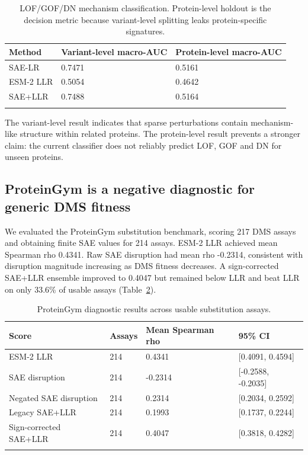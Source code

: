 \documentclass[pdflatex,sn-nature]{sn-jnl}
\begin{document}
\begin{table}[h]
\caption{LOF/GOF/DN mechanism classification. Protein-level holdout is the decision metric because variant-level splitting leaks protein-specific signatures.}\label{tab:mechanism}
\begin{tabular}{@{}lll@{}}
\toprule
Method & Variant-level macro-AUC & Protein-level macro-AUC \\
\midrule
SAE-LR & 0.7471 & 0.5161 \\
ESM-2 LLR & 0.5054 & 0.4642 \\
SAE+LLR & 0.7488 & 0.5164 \\
\botrule
\end{tabular}
\end{table}

The variant-level result indicates that sparse perturbations contain mechanism-like structure within related proteins. The protein-level result prevents a stronger claim: the current classifier does not reliably predict LOF, GOF and DN for unseen proteins.

\subsection{ProteinGym is a negative diagnostic for generic DMS fitness}

We evaluated the ProteinGym substitution benchmark, scoring 217 DMS assays and obtaining finite SAE values for 214 assays. ESM-2 LLR achieved mean Spearman rho 0.4341. Raw SAE disruption had mean rho -0.2314, consistent with disruption magnitude increasing as DMS fitness decreases. A sign-corrected SAE+LLR ensemble improved to 0.4047 but remained below LLR and beat LLR on only 33.6\% of usable assays (Table~\ref{tab:proteingym}).

\begin{table}[h]
\caption{ProteinGym diagnostic results across usable substitution assays.}\label{tab:proteingym}
\begin{tabular}{@{}llll@{}}
\toprule
Score & Assays & Mean Spearman rho & 95\% CI \\
\midrule
ESM-2 LLR & 214 & 0.4341 & [0.4091, 0.4594] \\
SAE disruption & 214 & -0.2314 & [-0.2588, -0.2035] \\
Negated SAE disruption & 214 & 0.2314 & [0.2034, 0.2592] \\
Legacy SAE+LLR & 214 & 0.1993 & [0.1737, 0.2244] \\
Sign-corrected SAE+LLR & 214 & 0.4047 & [0.3818, 0.4282] \\
\botrule
\end{tabular}
\end{table}
\end{document}
